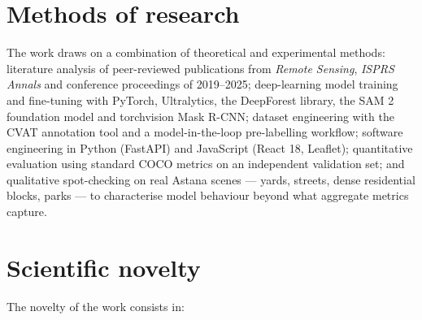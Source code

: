 \section{Methods of research}\label{methods-of-research}

The work draws on a combination of theoretical and experimental methods: literature analysis of peer-reviewed publications from \emph{Remote Sensing}, \emph{ISPRS Annals} and conference proceedings of 2019--2025; deep-learning model training and fine-tuning with PyTorch, Ultralytics, the DeepForest library, the SAM 2 foundation model and torchvision Mask R-CNN; dataset engineering with the CVAT annotation tool and a model-in-the-loop pre-labelling workflow; software engineering in Python (FastAPI) and JavaScript (React 18, Leaflet); quantitative evaluation using standard COCO metrics on an independent validation set; and qualitative spot-checking on real Astana scenes --- yards, streets, dense residential blocks, parks --- to characterise model behaviour beyond what aggregate metrics capture.

\section{Scientific novelty}\label{scientific-novelty}

The novelty of the work consists in:

